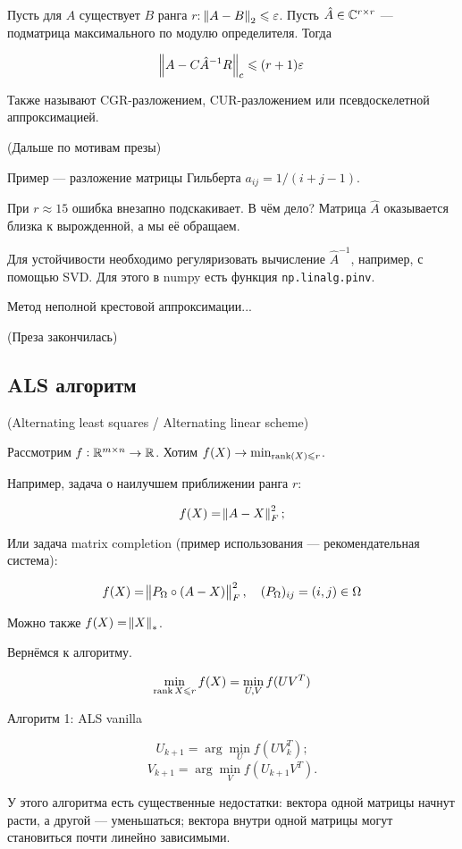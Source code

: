\begin{theorem}
    Пусть для $A$ существует $B$ ранга $r$: $\norm{A - B}_2 \leqslant \varepsilon$. Пусть
    $\hat{A} \in \mathbb{C}^{r \times r}$ --- подматрица максимального по модулю
    определителя. Тогда

    \[
        \norm{A - C \hat{A}^{-1} R}_c \leqslant (r + 1) \varepsilon
    \]
\end{theorem}

Также называют CGR-разложением, CUR-разложением или псевдоскелетной
аппроксимацией.

(Дальше по мотивам презы)

Пример --- разложение матрицы Гильберта $a_{ij} = 1 / (i + j - 1)$.

При $r \approx 15$ ошибка внезапно подскакивает. В чём дело? Матрица $\hat{A}$
оказывается близка к вырожденной, а мы её обращаем.

Для устойчивости необходимо регуляризовать вычисление $\hat{A}^{-1}$, например,
с помощью SVD. Для этого в numpy есть функция \verb|np.linalg.pinv|.

Метод неполной крестовой аппроксимации...

(Преза закончилась)

\subsection{ALS алгоритм}

(Alternating least squares / Alternating linear scheme)

Рассмотрим $f: \mathbb{R}^{m \times n} \to \mathbb{R}$. Хотим $f(X) \to \min_{\operatorname{rank}(X) \leqslant r}$.

Например, задача о наилучшем приближении ранга $r$:

\[
    f(X) = \norm{A - X}_F^2;
\]

Или задача matrix completion (пример использования --- рекомендательная
система):

\[
    f(X) = \norm{P_\Omega \circ (A - X)}_F^2,
    \quad (P_\Omega)_{ij} = (i, j) \in \Omega
\]

Можно также $f(X) = \norm{X}_*$.

Вернёмся к алгоритму.

\[
    \min_{\operatorname{rank}{X} \leqslant r} f(X) = \min_{U, V} f(U V^T)
\]

Алгоритм 1: ALS vanilla

\[
    U_{k + 1} = \arg\min_{U} f(U V_k^T);
\]
\[
    V_{k + 1} = \arg\min_{V} f(U_{k + 1} V^T).
\]

У этого алгоритма есть существенные недостатки: вектора одной матрицы начнут
расти, а другой --- уменьшаться; вектора внутри одной матрицы могут становиться
почти линейно зависимыми.

